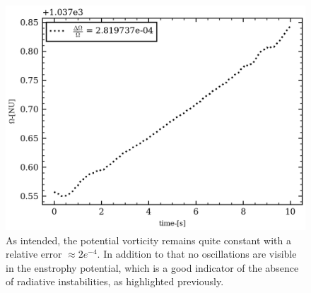 \documentclass[11pt,a4paper]{report}
\begin{document}
\begin{multicols}{2}
    \begin{figure}[H]
        \centering
        \includegraphics[width=1\linewidth]{./figure/potential_enstrophy_kelvin_wave.png}
        \caption{As intended, the potential vorticity remains quite constant with a relative error $\approx 2e^{-4}$. In addition to that no oscillations are visible in the enstrophy potential, which is a good indicator of the absence of radiative instabilities, as highlighted previously.}
        \label{}
    \end{figure}


\end{multicols}
\end{document}
